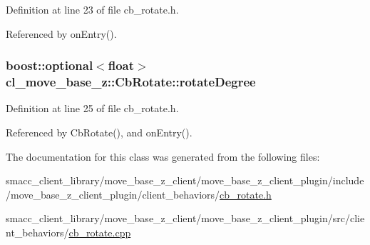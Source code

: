 Definition at line 23 of file cb\+\_\+rotate.\+h.



Referenced by on\+Entry().

\subsubsection[{\texorpdfstring{rotate\+Degree}{rotateDegree}}]{\setlength{\rightskip}{0pt plus 5cm}boost\+::optional$<$float$>$ cl\+\_\+move\+\_\+base\+\_\+z\+::\+Cb\+Rotate\+::rotate\+Degree}\hypertarget{classcl__move__base__z_1_1CbRotate_a83e9f97e917044f919c98a55d8e00db6}{}\label{classcl__move__base__z_1_1CbRotate_a83e9f97e917044f919c98a55d8e00db6}


Definition at line 25 of file cb\+\_\+rotate.\+h.



Referenced by Cb\+Rotate(), and on\+Entry().



The documentation for this class was generated from the following files\+:\begin{DoxyCompactItemize}
\item 
smacc\+\_\+client\+\_\+library/move\+\_\+base\+\_\+z\+\_\+client/move\+\_\+base\+\_\+z\+\_\+client\+\_\+plugin/include/move\+\_\+base\+\_\+z\+\_\+client\+\_\+plugin/client\+\_\+behaviors/\hyperlink{cb__rotate_8h}{cb\+\_\+rotate.\+h}\item 
smacc\+\_\+client\+\_\+library/move\+\_\+base\+\_\+z\+\_\+client/move\+\_\+base\+\_\+z\+\_\+client\+\_\+plugin/src/client\+\_\+behaviors/\hyperlink{cb__rotate_8cpp}{cb\+\_\+rotate.\+cpp}\end{DoxyCompactItemize}
